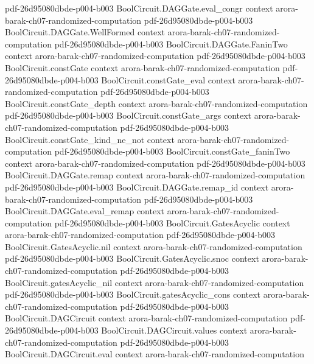 \begin{theorem}
  {pdf-26d95080dbde-p004-b003}
\proofstep
  {BoolCircuit.DAGGate.eval_congr}
  {context}
  {arora-barak-ch07-randomized-computation}
  {pdf-26d95080dbde-p004-b003}
\proofstep
  {BoolCircuit.DAGGate.WellFormed}
  {context}
  {arora-barak-ch07-randomized-computation}
  {pdf-26d95080dbde-p004-b003}
\proofstep
  {BoolCircuit.DAGGate.FaninTwo}
  {context}
  {arora-barak-ch07-randomized-computation}
  {pdf-26d95080dbde-p004-b003}
\proofstep
  {BoolCircuit.constGate}
  {context}
  {arora-barak-ch07-randomized-computation}
  {pdf-26d95080dbde-p004-b003}
\proofstep
  {BoolCircuit.constGate_eval}
  {context}
  {arora-barak-ch07-randomized-computation}
  {pdf-26d95080dbde-p004-b003}
\proofstep
  {BoolCircuit.constGate_depth}
  {context}
  {arora-barak-ch07-randomized-computation}
  {pdf-26d95080dbde-p004-b003}
\proofstep
  {BoolCircuit.constGate_args}
  {context}
  {arora-barak-ch07-randomized-computation}
  {pdf-26d95080dbde-p004-b003}
\proofstep
  {BoolCircuit.constGate_kind_ne_not}
  {context}
  {arora-barak-ch07-randomized-computation}
  {pdf-26d95080dbde-p004-b003}
\proofstep
  {BoolCircuit.constGate_faninTwo}
  {context}
  {arora-barak-ch07-randomized-computation}
  {pdf-26d95080dbde-p004-b003}
\proofstep
  {BoolCircuit.DAGGate.remap}
  {context}
  {arora-barak-ch07-randomized-computation}
  {pdf-26d95080dbde-p004-b003}
\proofstep
  {BoolCircuit.DAGGate.remap_id}
  {context}
  {arora-barak-ch07-randomized-computation}
  {pdf-26d95080dbde-p004-b003}
\proofstep
  {BoolCircuit.DAGGate.eval_remap}
  {context}
  {arora-barak-ch07-randomized-computation}
  {pdf-26d95080dbde-p004-b003}
\proofstep
  {BoolCircuit.GatesAcyclic}
  {context}
  {arora-barak-ch07-randomized-computation}
  {pdf-26d95080dbde-p004-b003}
\proofstep
  {BoolCircuit.GatesAcyclic.nil}
  {context}
  {arora-barak-ch07-randomized-computation}
  {pdf-26d95080dbde-p004-b003}
\proofstep
  {BoolCircuit.GatesAcyclic.snoc}
  {context}
  {arora-barak-ch07-randomized-computation}
  {pdf-26d95080dbde-p004-b003}
\proofstep
  {BoolCircuit.gatesAcyclic_nil}
  {context}
  {arora-barak-ch07-randomized-computation}
  {pdf-26d95080dbde-p004-b003}
\proofstep
  {BoolCircuit.gatesAcyclic_cons}
  {context}
  {arora-barak-ch07-randomized-computation}
  {pdf-26d95080dbde-p004-b003}
\proofstep
  {BoolCircuit.DAGCircuit}
  {context}
  {arora-barak-ch07-randomized-computation}
  {pdf-26d95080dbde-p004-b003}
\proofstep
  {BoolCircuit.DAGCircuit.values}
  {context}
  {arora-barak-ch07-randomized-computation}
  {pdf-26d95080dbde-p004-b003}
\proofstep
  {BoolCircuit.DAGCircuit.eval}
  {context}
  {arora-barak-ch07-randomized-computation}

\end{theorem}
